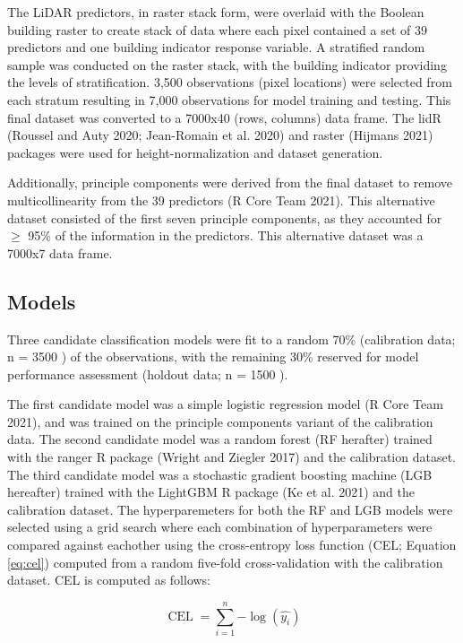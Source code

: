 \documentclass[]{elsarticle} %
\begin{document}
The LiDAR predictors, in raster stack form, were overlaid with the Boolean
building raster to create stack of data where each pixel contained a set of 39
predictors and one building indicator response variable.
A stratified random sample was conducted on the raster stack, with the building
indicator providing the levels of stratification.
3,500 observations (pixel locations) were selected from each stratum resulting
in 7,000 observations for model training and testing.
This final dataset was converted to a 7000x40 (rows, columns) data frame.
The lidR (Roussel and Auty 2020; Jean-Romain et al. 2020) and raster (Hijmans 2021) packages were used for
height-normalization and dataset generation.

Additionally, principle components were derived from the final dataset to
remove multicollinearity from the 39 predictors (R Core Team 2021).
This alternative dataset consisted of the first seven principle components,
as they accounted for \(\ge\) 95\% of the information in the predictors.
This alternative dataset was a 7000x7 data frame.

\hypertarget{models}{%
\subsection{Models}\label{models}}

Three candidate classification models were fit to a random 70\%
(calibration data; n =
3500
)
of the observations, with the remaining 30\% reserved for model performance
assessment (holdout data; n =
1500
).

The first candidate model was a simple logistic regression model (R Core Team 2021),
and was trained on the principle components variant of the calibration data.
The second candidate model was a random forest (RF herafter) trained with
the ranger R package (Wright and Ziegler 2017) and the calibration dataset.
The third candidate model was a stochastic gradient boosting machine
(LGB hereafter) trained with the LightGBM R package (Ke et al. 2021)
and the calibration dataset.
The hyperparemeters for both the RF and LGB models were selected using a grid
search where each combination of hyperparameters were compared against eachother
using the cross-entropy loss function (CEL; Equation \eqref{eq:cel})
computed from a random five-fold cross-validation with the calibration dataset.
CEL is computed as follows:

\begin{equation}
\operatorname{CEL} = \sum_{i=1}^{n}{-\log{(\hat{y_{i}})}} \label{eq:cel}
\end{equation}
\end{document}
